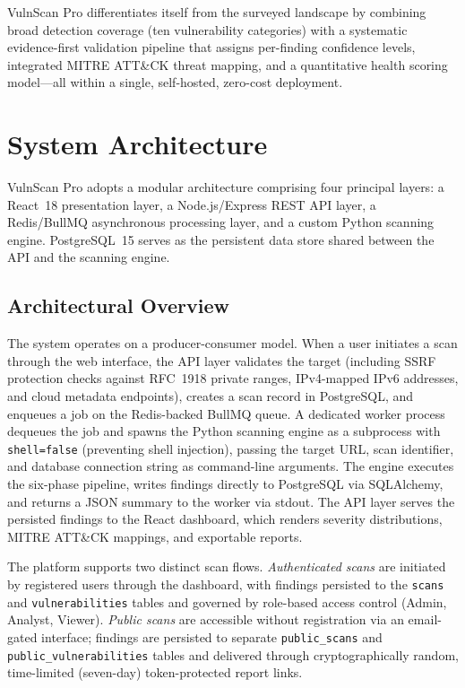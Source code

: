\documentclass[conference]{IEEEtran}
\begin{document}
VulnScan Pro differentiates itself from the surveyed landscape by combining broad detection coverage (ten vulnerability categories) with a systematic evidence-first validation pipeline that assigns per-finding confidence levels, integrated MITRE ATT\&CK threat mapping, and a quantitative health scoring model---all within a single, self-hosted, zero-cost deployment.

\section{System Architecture}

VulnScan Pro adopts a modular architecture comprising four principal layers: a React~18 presentation layer, a Node.js/Express REST API layer, a Redis/BullMQ asynchronous processing layer, and a custom Python scanning engine. PostgreSQL~15 serves as the persistent data store shared between the API and the scanning engine.

\subsection{Architectural Overview}

The system operates on a producer-consumer model. When a user initiates a scan through the web interface, the API layer validates the target (including SSRF protection checks against RFC~1918 private ranges, IPv4-mapped IPv6 addresses, and cloud metadata endpoints), creates a scan record in PostgreSQL, and enqueues a job on the Redis-backed BullMQ queue. A dedicated worker process dequeues the job and spawns the Python scanning engine as a subprocess with \texttt{shell=false} (preventing shell injection), passing the target URL, scan identifier, and database connection string as command-line arguments. The engine executes the six-phase pipeline, writes findings directly to PostgreSQL via SQLAlchemy, and returns a JSON summary to the worker via stdout. The API layer serves the persisted findings to the React dashboard, which renders severity distributions, MITRE ATT\&CK mappings, and exportable reports.

The platform supports two distinct scan flows. \textit{Authenticated scans} are initiated by registered users through the dashboard, with findings persisted to the \texttt{scans} and \texttt{vulnerabilities} tables and governed by role-based access control (Admin, Analyst, Viewer). \textit{Public scans} are accessible without registration via an email-gated interface; findings are persisted to separate \texttt{public\_scans} and \texttt{public\_vulnerabilities} tables and delivered through cryptographically random, time-limited (seven-day) token-protected report links.
\end{document}
